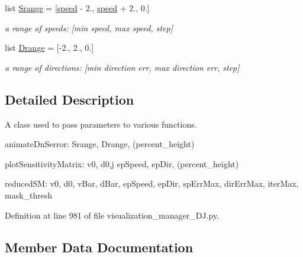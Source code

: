 \begin{DoxyCompactItemize}
list \mbox{\hyperlink{classvisualization__manager___d_j_1_1_visualization_manager_1_1params_a35c7f4aed6589385a5a87fca11b55a90}{Srange}} = \mbox{[}\mbox{\hyperlink{classvisualization__manager___d_j_1_1_visualization_manager_1_1params_af67bd6887a2486bd05116fca8ecbfe08}{speed}} -\/ 2., \mbox{\hyperlink{classvisualization__manager___d_j_1_1_visualization_manager_1_1params_af67bd6887a2486bd05116fca8ecbfe08}{speed}} + 2., 0.\mbox{]}
\begin{DoxyCompactList}\small\item\em a range of speeds\+: \mbox{[}min speed, max speed, step\mbox{]} \end{DoxyCompactList}\item 
list \mbox{\hyperlink{classvisualization__manager___d_j_1_1_visualization_manager_1_1params_af481a6429601c114aa05567f4c169ac1}{Drange}} = \mbox{[}-\/2., 2., 0.\mbox{]}
\begin{DoxyCompactList}\small\item\em a range of directions\+: \mbox{[}min direction err, max direction err, step\mbox{]} \end{DoxyCompactList}\end{DoxyCompactItemize}


\subsection{Detailed Description}
A class used to pass parameters to various functions. 

animate\+Dn\+Serror\+: Srange, Drange, (percent\+\_\+height)

plot\+Sensitivity\+Matrix\+: v0, d0,j ep\+Speed, ep\+Dir, (percent\+\_\+height)

reduced\+SM\+: v0, d0, v\+Bar, d\+Bar, ep\+Speed, ep\+Dir, sp\+Err\+Max, dir\+Err\+Max, iter\+Max, mask\+\_\+thresh 

Definition at line 981 of file visualization\+\_\+manager\+\_\+\+D\+J.\+py.



\subsection{Member Data Documentation}
\mbox{\label{classvisualization__manager___d_j_1_1_visualization_manager_1_1params_ae89c909d412f7f049eeee5203416f69e}} 
